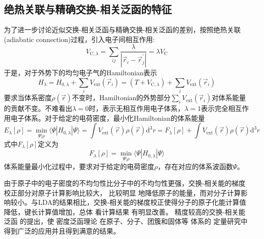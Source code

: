 \subsection{绝热关联与精确交换-相关泛函的特征}
为了进一步讨论近似交换-相关泛函与精确交换-相关泛函的差别，按照绝热关联\textrm{(adiabatic connection)}过程，引入电子间相互作用:
\begin{equation}
	V_{\mathrm{C},\lambda}=\sum_{ij}\dfrac{\lambda}{|\vec r_i-\vec r^{\prime}_j|}=\lambda V_{\mathrm{C}}
	\label{eq:electron-electron}
\end{equation}
于是，对于外势下的均匀电子气的\textrm{Hamiltonian}表示
\begin{equation}
	H_{\lambda}=H_{0,\lambda}+\sum_iV_{\mathrm{ext}}(\vec r_i)=(T+V_{\mathrm{C},\lambda})+\sum_iV_{\mathrm{ext}}(\vec r_i)
	\label{eq:H-interaction}
\end{equation}
要求当体系密度$\rho(\vec r)$不变时，\textrm{Hamiltonian}的外势部分$\sum\limits_iV_{\mathrm{ext}}(\vec r_i)$对体系能量的贡献不变。不难看出$\lambda=0$时，表示无相互作用电子体系，$\lambda=1$表示完全相互作用电子体系。对于给定的电荷密度，最小化\textrm{Hamiltonian}的体系能量
\begin{equation}
	E_{\lambda}[\rho]=\min_{\Psi|\rho}\langle\Psi|H_{0,\lambda}|\Psi\rangle=\int V_{\mathrm{ext}}(\vec r)\rho(\vec r)\mathrm{d}^3r=F_{\lambda}[\rho]+\int V_{\mathrm{ext}}(\vec r)\rho(\vec r)\mathrm{d}^3 r
	\label{eq:min-E}
\end{equation}
式中$F_{\lambda}[\rho]$定义为
\begin{equation}
	F_{\lambda}[\rho]=\min_{\Psi|\rho}\langle\Psi|H_{0,\lambda}|\Psi\rangle
	\label{eq:General-Functional-lambda}
\end{equation}
体系能量最小化过程中，要求对于给定的电荷密度$\rho$，存在对应的体系波函数$\Psi$。

由于原子中的电子密度的不均匀性比分子中的不均匀性更强，交换-相关能的梯度校正部分对原子{计算}影响比较大，%
比较明显%
{地}降低原子的能量，而对分子{计算}影响较小{。}与LDA的结果相比，交换-相关能的梯度校正使得分子的原子化能{计算值}降低，键长{计算值}增加，总体%
{看计算}结果%
有明显改善。%
精度较高的交换-相关能泛函%
的提出，使%
密度泛函理论%
{在}原子、分子、团簇和固体等%
体系的%
{定量研究中得到广泛的应用并且得到满意的结果。}

